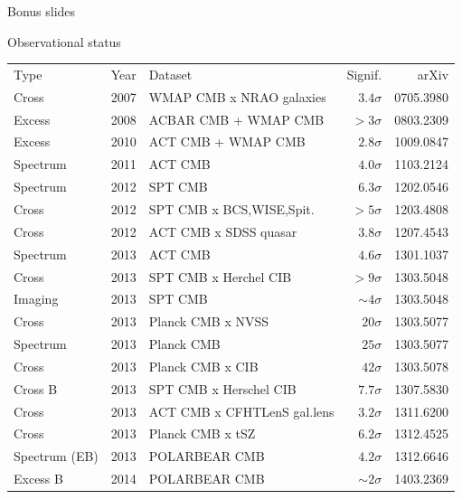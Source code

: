 \documentclass[table]{beamer}
\begin{document}
\begin{frame}{Bonus slides}
\end{frame}

\begin{frame}{Observational status}
	\small
	\begin{tabular}{lrlrr}
		Type & Year & Dataset & Signif. &arXiv \\
		\rowcolor{red!25}   Cross     & 2007 &WMAP CMB x NRAO galaxies& $3.4\sigma$ &0705.3980  \\
		\rowcolor{green!25} Excess    & 2008 &ACBAR CMB + WMAP CMB    &  $>3\sigma$ &0803.2309  \\
		\rowcolor{green!25} Excess    & 2010 &ACT CMB + WMAP CMB      & $2.8\sigma$ &1009.0847  \\
		\rowcolor{blue!25}  Spectrum  & 2011 &ACT CMB                 & $4.0\sigma$ &1103.2124  \\
		\rowcolor{blue!25}  Spectrum  & 2012 &SPT CMB                 & $6.3\sigma$ &1202.0546  \\
		\rowcolor{red!25}   Cross     & 2012 &SPT CMB x BCS,WISE,Spit.&  $>5\sigma$ &1203.4808  \\
		\rowcolor{red!25}   Cross     & 2012 &ACT CMB x SDSS quasar   & $3.8\sigma$ &1207.4543  \\
		\rowcolor{blue!25}  Spectrum  & 2013 &ACT CMB                 & $4.6\sigma$ &1301.1037  \\
		\rowcolor{red!25}   Cross     & 2013 &SPT CMB x Herchel CIB   &  $>9\sigma$ &1303.5048  \\
		\rowcolor{yellow!25}Imaging   & 2013 &SPT CMB                &$\sim4\sigma$ &1303.5048  \\
		\rowcolor{red!25}   Cross     & 2013 &Planck CMB x NVSS       &  $20\sigma$ &1303.5077  \\
		\rowcolor{blue!25}  Spectrum  & 2013 &Planck CMB              &  $25\sigma$ &1303.5077  \\
		\rowcolor{red!25}   Cross     & 2013 &Planck CMB x CIB        &  $42\sigma$ &1303.5078  \\
		\rowcolor{red!25}Cross B   & 2013 &SPT CMB x Herschel CIB  & $7.7\sigma$ &1307.5830  \\
		\rowcolor{red!25}   Cross     & 2013 &ACT CMB x CFHTLenS gal.lens& $3.2\sigma$ &1311.6200  \\
		\rowcolor{red!25}   Cross     & 2013 &Planck CMB x tSZ        & $6.2\sigma$ &1312.4525  \\
		\rowcolor{blue!25}  Spectrum (EB) & 2013 &POLARBEAR CMB           & $4.2\sigma$ &1312.6646  \\
		\rowcolor{green!25}  Excess B  & 2014 &POLARBEAR CMB          &$\sim2\sigma$ &1403.2369
	\end{tabular}
\end{frame}
\end{document}

